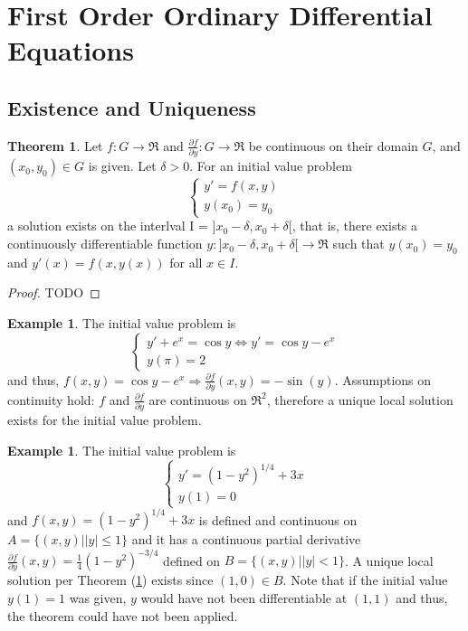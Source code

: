 \documentclass[10pt,a4paper]{article}
\theoremstyle{definition}
\newtheorem{example}[defn]{Example}
\newtheorem{thm}{Theorem}[section]
\begin{document}
\section{First Order Ordinary Differential Equations}
\subsection{Existence and Uniqueness}
\begin{thm} \label{thm:1}
Let $f: G \to \Re$ and $\frac{\partial f}{\partial y}: G \to \Re$ be continuous
on their domain $G$, and $(x_0, y_0) \in G$ is given. Let $\delta > 0$. For an
initial value problem 
\[
  \left \{
  \begin{array}{ll}
    y' = f(x, y) \\
    y(x_0) = y_0
  \end{array}
  \right.
\]
a solution exists on the interlval I = $]x_0 - \delta, x_0 + \delta[$, that is,
there exists a continuously differentiable function $y: ]x_0 - \delta, x_0 +
\delta[ \to \Re$ such that $y(x_0) = y_0$ and $y'(x) = f(x, y(x))$ for all $x
\in I$.
\begin{proof}
TODO
\end{proof}
\end{thm}
\begin{example}
The initial value problem is
\[
  \left \{
  \begin{array}{ll}
    y' + e^x = \cos y \Leftrightarrow y' = \cos y - e^x \\
    y(\pi) = 2
  \end{array}
  \right.
\]
and thus, $f(x, y) = \cos y - e^x \Rightarrow \frac{\partial f}{\partial y}(x,
y) = -\sin(y)$. Assumptions on continuity hold: $f$ and $\frac{\partial
f}{\partial y}$ are continuous on $\Re^2$, therefore a unique local solution
exists for the initial value problem.
\end{example}
\begin{example}
The initial value problem is
\[
  \left \{
  \begin{array}{ll}
    y' = (1 - y^2)^{1/4} + 3 x \\
    y(1) = 0
  \end{array}
  \right.
\]
and $f(x, y) = (1 - y^2)^{1/4} + 3 x$ is defined and continuous on $A = \{ (x,
y) | |y| \leq 1 \}$ and it has a continuous partial derivative $\frac{\partial
f}{\partial y}(x, y) = \frac{1}{4} (1 - y^2)^{-3/4}$ defined on $B = \{ (x, y)
| |y| < 1 \}$. A unique local solution per Theorem (\ref{thm:1}) exists since
$(1, 0) \in B$. Note that if the initial value $y(1) = 1$ was given, $y$ would
have not been differentiable at $(1, 1)$ and thus, the theorem could have not
been applied.
\end{example}
\end{document}
